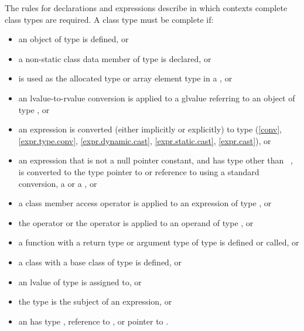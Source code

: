 \begin{note} The rules for declarations and expressions
describe in which contexts complete class types are required. A class
type  must be complete if:
\begin{itemize}
\item an object of type  is defined, or
\item a non-static class data member of type  is
declared, or
\item {} is used as the allocated type or array element type in a
, or
\item an lvalue-to-rvalue conversion is applied to
a glvalue referring
to an object of type , or
\item an expression is converted (either implicitly or explicitly) to
type  (\ref{conv}, \ref{expr.type.conv},
\ref{expr.dynamic.cast}, \ref{expr.static.cast}, \ref{expr.cast}), or
\item an expression that is not a null pointer constant, and has type
other than \cv{}~, is converted to the type pointer to 
or reference to  using a standard conversion,
a  or
a , or
\item a class member access operator is applied to an expression of type
, or
\item the  operator or the
 operator is applied to an operand of
type , or
\item a function with a return type or argument type of type 
is defined or called, or
\item a class with a base class of type  is
defined, or
\item an lvalue of type  is assigned to, or
\item the type  is the subject of an
 expression, or
\item an  has type , reference to
, or pointer to .
\end{itemize}
\end{note}


